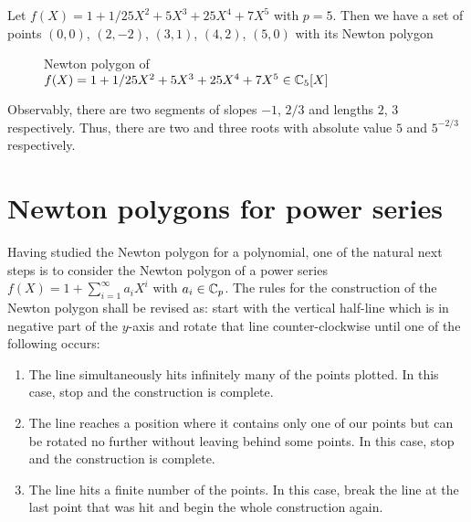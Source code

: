 \begin{example} Let $f(X) = 1 + 1/25 X^2 + 5X^3 + 25X^4 + 7X^5$ with $p = 5$. Then we have a set of points $(0,0)$, $(2,-2)$, $(3,1)$, $(4,2)$, $(5,0)$ with its Newton polygon

\begin{figure}[H]
    \centering
    \label{fig:newton-polygon2}
    \caption{Newton polygon of $f(X)=1+1/25 X^2+5X^3+25X^4+7X^5\in\mathbb{C}_5[X]$}
\end{figure}
Observably, there are two segments of slopes $-1$, $2/3$ and lengths $2$, $3$ respectively. Thus, there are two and three roots with absolute value $5$ and $5^{-2/3}$ respectively. 
\end{example}


\section{Newton polygons for power series}
Having studied the Newton polygon for a polynomial, one of the natural next steps is to consider the Newton polygon of a power series $f(X) = 1 + \sum_{i=1}^{\infty} a_i X^i$ with $a_i \in \mathbb{C}_p$. 
The rules for the construction of the Newton polygon shall be revised as: start with the vertical half-line which is in negative part of the $y$-axis and rotate that line counter-clockwise until one of the following occurs:
\begin{enumerate}
    \item The line simultaneously hits infinitely many of the points plotted. In this case, stop and the construction is complete.
    \item The line reaches a position where it contains only one of our points but can be rotated no further without leaving behind some points. In this case, stop and the construction is complete.
    \item The line hits a finite number of the points. In this case, break the line at the last point that was hit and begin the whole construction again.
\end{enumerate}

